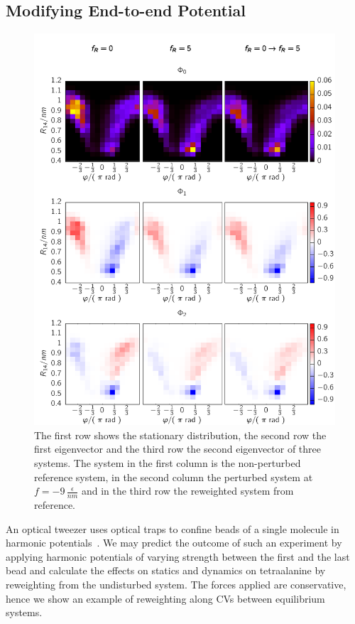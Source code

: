 \subsection{Modifying End-to-end Potential}
\label{sec:DrivingEAla}
\begin{figure}
\vspace*{-0.7cm}
\centering
 \includegraphics{../plots/Frew/Evec_1002_1902.pdf}
 \caption[Detailed relaxation process analysis of the two slowest processes of the tetraalanine peptide reference model and modified by an end-to-end potential.]{The first row shows the  stationary distribution, the second row the first eigenvector and the third row the second eigenvector of three systems. The system in the first column is the non-perturbed reference system, in the second column the perturbed system at $f=-9\,\frac{\epsilon}{nm}$ and in the third row the reweighted system from reference. }
 \label{fig:EvecAla}
\end{figure}

An optical tweezer uses optical traps to confine beads of a single molecule in harmonic potentials~\cite{jiao2017single}.  We may predict the outcome of such an experiment by applying harmonic potentials of varying strength between the first and the last bead and calculate the effects on statics and dynamics on tetraalanine by reweighting from the undisturbed system. The forces applied are conservative, hence we show an example of reweighting along CVs between equilibrium systems.

